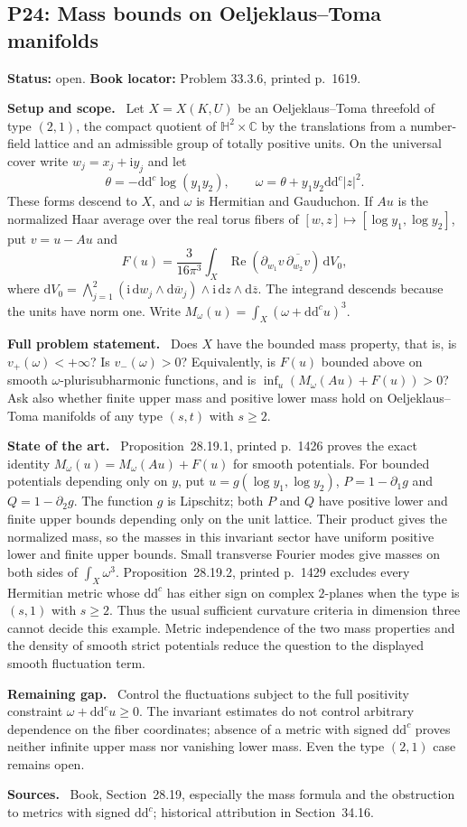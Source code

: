 \documentclass[11pt]{article}
\newcommand{\ddc}{\mathrm d\mathrm d^c}
\newcommand{\field}[1]{\par\medskip\noindent\textbf{#1.}\ }
\begin{document}
\subsection{P24: Mass bounds on Oeljeklaus--Toma manifolds}
\label{P24}
\noindent\textbf{Status:} open. \textbf{Book locator:} Problem 33.3.6, printed p.~1619.
\field{Setup and scope} Let $X=X(K,U)$ be an Oeljeklaus--Toma threefold of type $(2,1)$, the compact quotient of $\mathbb H^2\times\mathbb C$ by the translations from a number-field lattice and an admissible group of totally positive units. On the universal cover write $w_j=x_j+\mathrm i y_j$ and let
\[
 \theta=-\ddc\log(y_1y_2),\qquad \omega=\theta+y_1y_2\ddc|z|^2.
\]
These forms descend to $X$, and $\omega$ is Hermitian and Gauduchon. If $Au$ is the normalized Haar average over the real torus fibers of $[w,z]\mapsto[\log y_1,\log y_2]$, put $v=u-Au$ and
\[
 F(u)=\frac{3}{16\pi^3}\int_X\operatorname{Re}(\partial_{w_1}v\,\overline{\partial_{w_2}v})\,\mathrm dV_0,
\]
where $\mathrm dV_0=\bigwedge_{j=1}^2(\mathrm i\,\mathrm dw_j\wedge\mathrm d\overline w_j)\wedge\mathrm i\,\mathrm dz\wedge\mathrm d\overline z$. The integrand descends because the units have norm one. Write $M_\omega(u)=\int_X(\omega+\ddc u)^3$.
\field{Full problem statement} Does $X$ have the bounded mass property, that is, is $v_+(\omega)<+\infty$? Is $v_-(\omega)>0$? Equivalently, is $F(u)$ bounded above on smooth $\omega$-plurisubharmonic functions, and is $\inf_u(M_\omega(Au)+F(u))>0$? Ask also whether finite upper mass and positive lower mass hold on Oeljeklaus--Toma manifolds of any type $(s,t)$ with $s\geq2$.
\field{State of the art} Proposition~28.19.1, printed p.~1426 proves the exact identity $M_\omega(u)=M_\omega(Au)+F(u)$ for smooth potentials. For bounded potentials depending only on $y$, put $u=g(\log y_1,\log y_2)$, $P=1-\partial_1g$ and $Q=1-\partial_2g$. The function $g$ is Lipschitz; both $P$ and $Q$ have positive lower and finite upper bounds depending only on the unit lattice. Their product gives the normalized mass, so the masses in this invariant sector have uniform positive lower and finite upper bounds. Small transverse Fourier modes give masses on both sides of $\int_X\omega^3$. Proposition~28.19.2, printed p.~1429 excludes every Hermitian metric whose $\ddc$ has either sign on complex $2$-planes when the type is $(s,1)$ with $s\geq2$. Thus the usual sufficient curvature criteria in dimension three cannot decide this example. Metric independence of the two mass properties and the density of smooth strict potentials reduce the question to the displayed smooth fluctuation term.
\field{Remaining gap} Control the fluctuations subject to the full positivity constraint $\omega+\ddc u\geq0$. The invariant estimates do not control arbitrary dependence on the fiber coordinates; absence of a metric with signed $\ddc$ proves neither infinite upper mass nor vanishing lower mass. Even the type $(2,1)$ case remains open.
\field{Sources} Book, Section~28.19, especially the mass formula and the obstruction to metrics with signed $\ddc$; historical attribution in Section~34.16.
\end{document}
